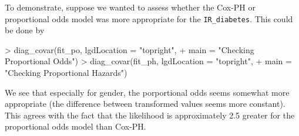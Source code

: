 \documentclass[a4paper]{article}
\begin{document}
To demonstrate, suppose we wanted to assess whether the Cox-PH or proportional odds model was more appropriate for the \texttt{IR\_diabetes}. This could be done by 
 
\begin{Schunk}
\begin{Sinput}
> diag_covar(fit_po, lgdLocation = "topright", 
+            main = "Checking Proportional Odds")
> diag_covar(fit_ph, lgdLocation = "topright", 
+            main = "Checking Proportional Hazards")
\end{Sinput}
\end{Schunk}

We see that especially for gender, the porportional odds
seems somewhat more appropriate (the difference between 
transformed values seems more constant). This agrees
with the fact that the likelihood is approximately 2.5 greater
for the proportional odds model than Cox-PH. 
  
\end{document}
